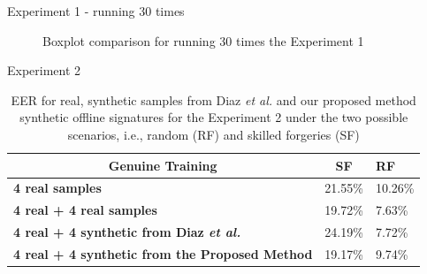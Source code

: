 \documentclass{beamer}
\begin{document}
\begin{frame}{Experiment 1 - running 30 times}
\begin{figure}[!htb]
\caption{Boxplot comparison for running 30 times the Experiment 1}
\end{figure}


\end{frame}

\begin{frame}{Experiment 2}

\begin{table}[!htb]
    \renewcommand{\arraystretch}{1.3}
    \caption{EER for real, synthetic samples from Diaz \textit{et al.} \cite{diaz2014generation} and our proposed method synthetic offline signatures for the Experiment 2 under the two possible scenarios, i.e., random (RF) and skilled forgeries (SF)}
    \label{exp2_results_table}
    \centering
    \begin{tabular}{|l|l|l|}
        \hline
        \multicolumn{1}{|c|}{\textbf{Genuine Training}} & \multicolumn{1}{c|}{\textbf{SF}} & \textbf{RF} \\ \hline
        \textbf{4 real samples}                                         & 21.55\%                     & 10.26\%                         \\ \hline
        \textbf{4 real + 4 real samples}                       & 19.72\%                      & 7.63\%                        \\ \hline
        \textbf{4 real + 4 synthetic from Diaz \textit{et al.}}                           & 24.19\%                         & 7.72\%                \\ \hline
        \textbf{4 real + 4 synthetic from the Proposed Method}                           & 19.17\%         & 9.74\%                        \\ \hline
    \end{tabular}

\end{table}


\end{frame}
\end{document}
